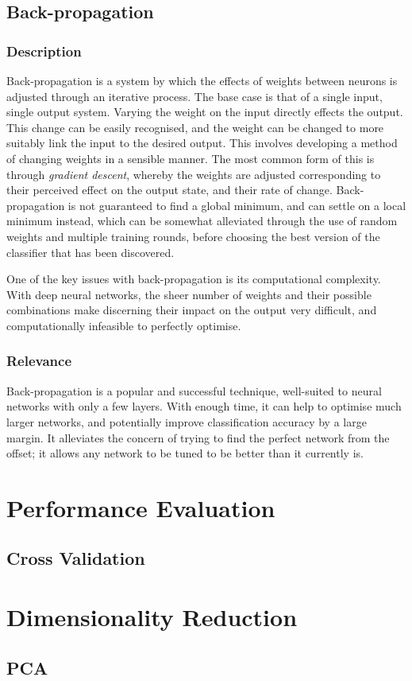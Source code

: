 \subsection{Back-propagation}
\subsubsection{Description}
Back-propagation is a system by which the effects of weights between neurons is adjusted through an iterative process. The base case is that of a single input, single output system. 
Varying the weight on the input directly effects the output. This change can be easily recognised, and the weight can be changed to more suitably link the input to the desired output. This involves developing a method of changing weights in a sensible manner. The most common form of this is through \textit{gradient descent}, whereby the weights are adjusted corresponding to their perceived effect on the output state, and their rate of change. Back-propagation is not guaranteed to find a global minimum, and can settle on a local minimum instead, which can be somewhat alleviated through the use of random weights and multiple training rounds, before choosing the best version of the classifier that has been discovered. 

One of the key issues with back-propagation is its computational complexity. With deep neural networks, the sheer number of weights and their possible combinations make discerning their impact on the output very difficult, and computationally infeasible to perfectly optimise.

\subsubsection{Relevance}
Back-propagation is a popular and successful technique, well-suited to neural networks with only a few layers. With enough time, it can help to optimise much larger networks, and potentially improve classification accuracy by a large margin. It alleviates the concern of trying to find the perfect network from the offset; it allows any network to be tuned to be better than it currently is.

\section{Performance Evaluation}
\subsection{Cross Validation}\label{lit:loocv}


\section{Dimensionality Reduction}
\subsection{PCA}\label{lit:PCA}

